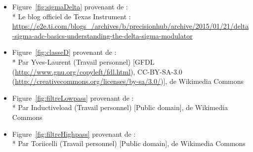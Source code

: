\documentclass[10pt, oneside, a4paper]{article}
\begin{document}
\begin{itemize}
\item Figure~\ref{fig:sigmaDelta} provenant de :\\*
Le blog officiel de Texas Instrument :
\url{https://e2e.ti.com/blogs_/archives/b/precisionhub/archive/2015/01/21/delta-sigma-adc-basics-understanding-the-delta-sigma-modulator}

\item Figure~\ref{fig:classeD} provenant de :\\*
Par Yves-Laurent (Travail personnel) [GFDL (\url{http://www.gnu.org/copyleft/fdl.html}),
CC-BY-SA-3.0 (\url{http://creativecommons.org/licenses/by-sa/3.0/})], de Wikimedia Commons

\item Figure~\ref{fig:filtreLowpass} provenant de :\\*
Par Inductiveload (Travail personnel) [Public domain], de Wikimedia Commons

\item Figure~\ref{fig:filtreHighpass} provenant de :\\*
Par Toriicelli (Travail personnel) [Public domain], de Wikimedia Commons
\end{itemize}

{}




\appendix
\clearpage



\end{document}

